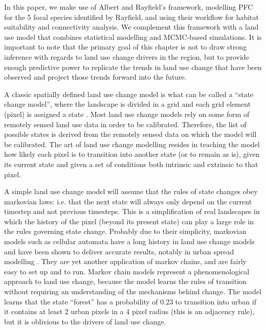 In this paper, we make use of Albert and Rayfield’s framework, modelling PFC for the 5 focal species identified by Rayfield, and using their workflow for habitat suitability and connectivity analysis. We complement this framework with a land use model that combines statistical modelling and MCMC-based simulations. It is important to note that the primary goal of this chapter is not to draw strong inference with regards to land use change drivers in the region, but to provide enough predictive power to replicate the trends in land use change that have been observed and project those trends forward into the future.

A classic spatially defined land use change model is what can be called a “state change model”, where the landscape is divided in a grid and each grid element (pixel) is assigned a state \citep{daniel_state-and-transition_2016}. Most land use change models rely on some form of remotely sensed land use data in order to be calibrated. Therefore, the list of possible states is derived from the remotely sensed data on which the model will be calibrated. The art of land use change modelling resides in teaching the model how likely each pixel is to transition into another state (or to remain as is), given its current state and given a set of conditions both intrinsic and extrinsic to that pixel. 

A simple land use change model will assume that the rules of state changes obey markovian laws: i.e. that the next state will always only depend on the current timestep and not previous timesteps. This is a simplification of real landscapes in which the history of the pixel (beyond its present state) can play a large role in the rules governing state change. Probably due to their simplicity, markovian models such as cellular automata have a long history in land use change models and have been shown to deliver accurate results, notably in urban spread modelling \citep{soares-filho_dinamicastochastic_2002, jokar_arsanjani_integration_2013, iacono_markov_2015}. They are yet another application of markov chains, and are fairly easy to set up and to run. Markov chain models represent a phenomenological approach to land use change, because the model learns the rules of transition without requiring an understanding of the mechanisms behind change. The model learns that the state “forest” has a probability of 0.23 to transition into urban if it contains at least 2 urban pixels in a 4 pixel radius (this is an adjacency rule), but it is oblivious to the drivers of land use change.

